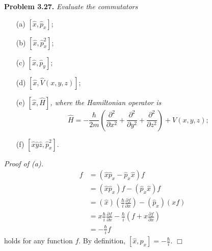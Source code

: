 \documentclass{article}
\begin{document}
\textbf{Problem 3.27.}
\emph{Evaluate the commutators}
\begin{enumerate}
\item[(a)]
$[\hat{x}, \hat{p}_x]$;
\item[(b)]
$[\hat{x}, \hat{p}_x^2]$;
\item[(c)]
$[\hat{x}, \hat{p}_y]$;
\item[(d)]
$[\hat{x}, \hat{V}(x,y,z)]$;
\item[(e)]
\emph{$[\hat{x}, \hat{H}]$, where the Hamiltonian operator is
$$\hat{H} = -\frac{\hbar}{2m}\left(
\frac{\partial^2}{\partial x^2} + \frac{\partial^2}{\partial y^2} + \frac{\partial^2}{\partial z^2}
\right) + V(x,y,z);$$}
\item[(f)]
$[\hat{x}\hat{y}\hat{z}, \hat{p}_x^2]$. \\
\end{enumerate}

\emph{Proof of (a).}
\begin{align*}
[\hat{x}, \hat{p}_x]f
&= (\hat{x}\hat{p}_x - \hat{p}_x \hat{x})f \\
&= (\hat{x}\hat{p}_x)f - (\hat{p}_x \hat{x})f \\
&= (\hat{x})\left( \frac{\hbar}{i}\frac{\partial f}{\partial x} \right)
  - (\hat{p}_x)(xf) \\
&= x \frac{\hbar}{i}\frac{\partial f}{\partial x}
  - \frac{\hbar}{i}\left( f + x \frac{\partial f}{\partial x} \right) \\
&= - \frac{\hbar}{i} f
\end{align*}
holds for any function $f$.
By definition,
$[\hat{x}, \hat{p}_x] = - \frac{\hbar}{i}$.
$\Box$ \\\\



\end{document}
